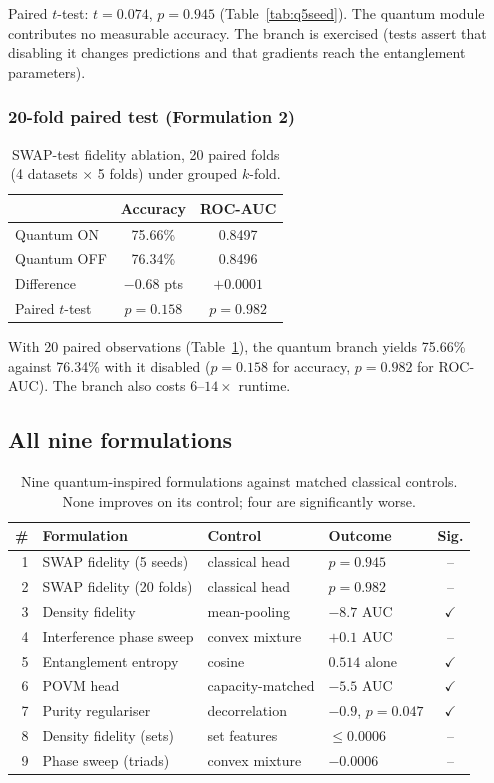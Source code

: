 \documentclass[preprint,12pt]{elsarticle}
\begin{document}
Paired $t$-test: $t = 0.074$, $p = 0.945$ (Table~\ref{tab:q5seed}). The
quantum module contributes no measurable accuracy. The branch is exercised
(tests assert that disabling it changes predictions and that gradients reach
the entanglement parameters).

\subsubsection{20-fold paired test (Formulation 2)}

\begin{table}[t]
\caption{SWAP-test fidelity ablation, 20 paired folds (4 datasets $\times$ 5
folds) under grouped $k$-fold.}
\label{tab:q20fold}
\centering
\begin{tabular}{@{}lcc@{}}
\toprule
& Accuracy & ROC-AUC \\
\midrule
Quantum ON & 75.66\% & 0.8497 \\
Quantum OFF & 76.34\% & 0.8496 \\
Difference & $-0.68$ pts & $+0.0001$ \\
Paired $t$-test & $p = 0.158$ & $p = 0.982$ \\
\bottomrule
\end{tabular}
\end{table}

With 20 paired observations (Table~\ref{tab:q20fold}), the quantum branch
yields 75.66\% against 76.34\% with it disabled ($p = 0.158$ for accuracy,
$p = 0.982$ for ROC-AUC). The branch also costs $6$--$14\times$ runtime.

\subsection{All nine formulations}

\begin{table}[t]
\caption{Nine quantum-inspired formulations against matched classical
controls. None improves on its control; four are significantly worse.}
\label{tab:quantum}
\centering
\small
\begin{tabular}{@{}rlllc@{}}
\toprule
\# & Formulation & Control & Outcome & Sig. \\
\midrule
1 & SWAP fidelity (5 seeds) & classical head & $p=0.945$ & -- \\
2 & SWAP fidelity (20 folds) & classical head & $p=0.982$ & -- \\
3 & Density fidelity & mean-pooling & $-8.7$ AUC & $\checkmark$ \\
4 & Interference phase sweep & convex mixture & $+0.1$ AUC & -- \\
5 & Entanglement entropy & cosine & $0.514$ alone & $\checkmark$ \\
6 & POVM head & capacity-matched & $-5.5$ AUC & $\checkmark$ \\
7 & Purity regulariser & decorrelation & $-0.9$, $p{=}0.047$ & $\checkmark$ \\
8 & Density fidelity (sets) & set features & $\leq 0.0006$ & -- \\
9 & Phase sweep (triads) & convex mixture & $-0.0006$ & -- \\
\bottomrule
\end{tabular}
\end{table}
\end{document}
